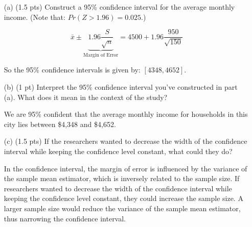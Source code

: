 \documentclass{./../../../Latex/tests}
\begin{document}
\begin{enumerate}

\item[(a)] (1.5 pts) Construct a 95\% confidence interval for the average monthly income. (Note that: $Pr(Z>1.96) = 0.025$.)

$$ \bar{x} \pm \underbrace{1.96 \frac{S}{\sqrt{n}}}_{\text{Margin of Error}} = 4500 + 1.96 \frac{950}{\sqrt{150}} $$

So the 95\% confidence intervals is given by: $[4348, 4652]$. 

\item[(b)] (1 pt)  Interpret the 95\% confidence interval you've constructed in part (a). What does it mean in the context of the study?

We are 95\% confident that the average monthly income for households in this city lies between \$4,348 and \$4,652. 
\item[(c)] (1.5 pts) If the researchers wanted to decrease the width of the confidence interval while keeping the confidence level constant, what could they do? 

In the confidence interval, the margin of error is influenced by the variance of the sample mean estimator, which is inversely related to the sample size. If researchers wanted to decrease the width of the confidence interval while keeping the confidence level constant, they could increase the sample size. A larger sample size would reduce the variance of the sample mean estimator, thus narrowing the confidence interval.

\end{enumerate}
\end{document}
